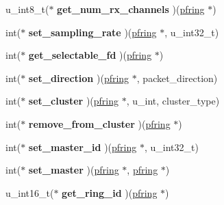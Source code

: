 \begin{DoxyCompactItemize}
\item 
\hypertarget{struct____pfring_ad616f3003e0dd173b8630981cd5921fb}{
u\_\-int8\_\-t($\ast$ {\bfseries get\_\-num\_\-rx\_\-channels} )(\hyperlink{struct____pfring}{pfring} $\ast$)}
\label{struct____pfring_ad616f3003e0dd173b8630981cd5921fb}

\item 
\hypertarget{struct____pfring_abc9bfd596520e766b5427ea63cd3c7d1}{
int($\ast$ {\bfseries set\_\-sampling\_\-rate} )(\hyperlink{struct____pfring}{pfring} $\ast$, u\_\-int32\_\-t)}
\label{struct____pfring_abc9bfd596520e766b5427ea63cd3c7d1}

\item 
\hypertarget{struct____pfring_aae1b8fa60946a50217d86c10666b61cb}{
int($\ast$ {\bfseries get\_\-selectable\_\-fd} )(\hyperlink{struct____pfring}{pfring} $\ast$)}
\label{struct____pfring_aae1b8fa60946a50217d86c10666b61cb}

\item 
\hypertarget{struct____pfring_ae96de3574324e340ae008cb324e42b76}{
int($\ast$ {\bfseries set\_\-direction} )(\hyperlink{struct____pfring}{pfring} $\ast$, packet\_\-direction)}
\label{struct____pfring_ae96de3574324e340ae008cb324e42b76}

\item 
\hypertarget{struct____pfring_acbee907acd8d270ac7b02573dc7860f5}{
int($\ast$ {\bfseries set\_\-cluster} )(\hyperlink{struct____pfring}{pfring} $\ast$, u\_\-int, cluster\_\-type)}
\label{struct____pfring_acbee907acd8d270ac7b02573dc7860f5}

\item 
\hypertarget{struct____pfring_a484e50048a7646fe74498ac21d86d6b5}{
int($\ast$ {\bfseries remove\_\-from\_\-cluster} )(\hyperlink{struct____pfring}{pfring} $\ast$)}
\label{struct____pfring_a484e50048a7646fe74498ac21d86d6b5}

\item 
\hypertarget{struct____pfring_a929fe4369b32c2394fcd3bde24708cc4}{
int($\ast$ {\bfseries set\_\-master\_\-id} )(\hyperlink{struct____pfring}{pfring} $\ast$, u\_\-int32\_\-t)}
\label{struct____pfring_a929fe4369b32c2394fcd3bde24708cc4}

\item 
\hypertarget{struct____pfring_a73bfe055533dba0808de867f32bfa09c}{
int($\ast$ {\bfseries set\_\-master} )(\hyperlink{struct____pfring}{pfring} $\ast$, \hyperlink{struct____pfring}{pfring} $\ast$)}
\label{struct____pfring_a73bfe055533dba0808de867f32bfa09c}

\item 
\hypertarget{struct____pfring_a6b99f8aa911cd87b3c97d8fac82a1864}{
u\_\-int16\_\-t($\ast$ {\bfseries get\_\-ring\_\-id} )(\hyperlink{struct____pfring}{pfring} $\ast$)}
\label{struct____pfring_a6b99f8aa911cd87b3c97d8fac82a1864}


\end{DoxyCompactItemize}
